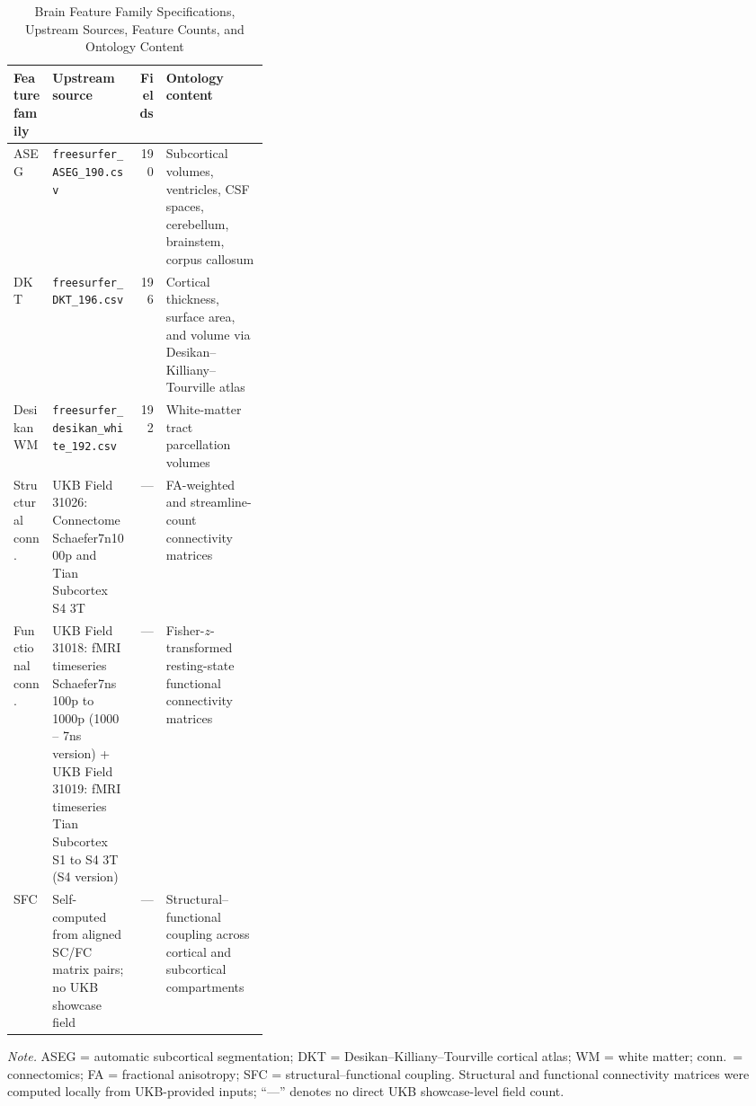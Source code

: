 \documentclass[11pt,a4paper,twoside]{article}
\begin{document}
\begin{table}[H]
\caption{Brain Feature Family Specifications, Upstream Sources, Feature Counts, and Ontology Content}
\label{tab:s2}
\footnotesize
\begin{tabularx}{\linewidth}{l p{0.33\linewidth} r X}
\toprule
Feature family & Upstream source & Fields & Ontology content \\
\midrule
ASEG & \texttt{freesurfer\_ASEG\_190.csv} & 190 & Subcortical volumes, ventricles, CSF spaces, cerebellum, brainstem, corpus callosum \\
DKT & \texttt{freesurfer\_DKT\_196.csv} & 196 & Cortical thickness, surface area, and volume via Desikan--Killiany--Tourville atlas \\
Desikan WM & \texttt{freesurfer\_desikan\_white\_192.csv} & 192 & White-matter tract parcellation volumes \\
Structural conn. & UKB Field 31026: Connectome Schaefer7n1000p and Tian Subcortex S4 3T & --- & FA-weighted and streamline-count connectivity matrices \\
Functional conn. & UKB Field 31018: fMRI timeseries Schaefer7ns 100p to 1000p (1000 -- 7ns version) + UKB Field 31019: fMRI timeseries Tian Subcortex S1 to S4 3T (S4 version) & --- & Fisher-$z$-transformed resting-state functional connectivity matrices \\
SFC & Self-computed from aligned SC/FC matrix pairs; no UKB showcase field & --- & Structural--functional coupling across cortical and subcortical compartments \\
\bottomrule
\end{tabularx}
\par\smallskip\noindent\small\textit{Note.} ASEG = automatic subcortical segmentation; DKT = Desikan--Killiany--Tourville cortical atlas; WM = white matter; conn.\ = connectomics; FA = fractional anisotropy; SFC = structural--functional coupling. Structural and functional connectivity matrices were computed locally from UKB-provided inputs; ``---'' denotes no direct UKB showcase-level field count.
\end{table}
\end{document}
